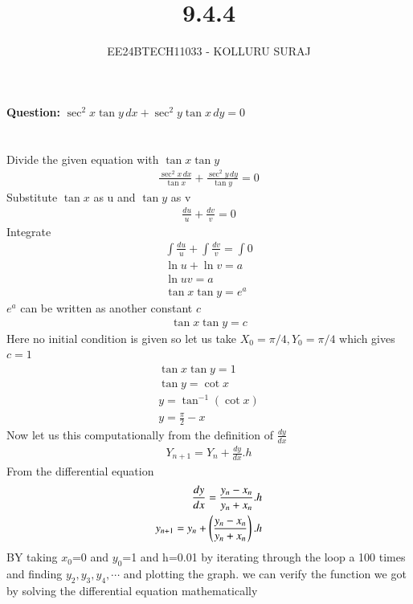 \documentclass[journal]{IEEEtran}
\numberwithin{equation}{enumi}
\numberwithin{figure}{enumi}
\begin{document}

\title{9.4.4}
\author{EE24BTECH11033 - KOLLURU SURAJ}
{\let\newpage\relax\maketitle}
\textbf{Question:} 
$\sec^2 x \tan y \, dx + \sec^2 y \tan x \, dy = 0$
\\\\
\solution\\
Divide the given equation with $\tan x \tan y$
\begin{align}
    \frac{\sec^2 x \, dx}{\tan x} + \frac{\sec^2 y \, dy}{\tan y} = 0
\end{align}
Substitute $\tan x$ as u and $\tan y$ as v
\begin{align}
    \frac{du}{u} + \frac{dv}{v} = 0
\end{align}
Integrate
\begin{align}
\int  \frac{du}{u} + \int \frac{dv}{v} = \int 0\\
    \ln u + \ln v = a\\
    \ln uv = a\\
    \tan x \tan y = e^a
\end{align}
 $e^a$ can be written as another constant $c$
 \begin{align}
      \tan x \tan y = c
 \end{align}
Here no initial condition is given so let us take $X_{0}=\pi/4,Y_{0}=\pi/4$ which gives $c=1$
\begin{align}
    \tan x \tan y = 1\\
    \tan y = \cot x\\
    y = \tan^{-1}(\cot x)\\
    y= \frac{\pi}{2}- x
\end{align}
Now let us  this computationally from the definition of $\frac{dy}{dx}$ 
\begin{align}
    Y_{n+1}=Y_n+\frac{dy}{dx}.h
\end{align}
From the differential equation
\begin{align}
    \frac{dy}{dx}=\frac{y_n-x_n}{y_n+x_n}.h\\
    y_{n+1}=y_n+\left(\frac{y_n-x_n}{y_n+x_n}\right).h
\end{align}
BY taking $x_0$=0 and $y_0$=1 and h=0.01  by iterating through the loop a 100 times and finding $y_2,y_3,y_4,\cdots$ and plotting the graph. we can verify the function we got by solving the differential equation mathematically
\end{document}
